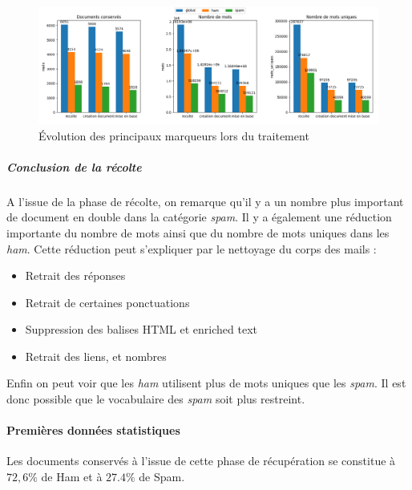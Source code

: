 \documentclass[a4paper,12pt]{article}
\begin{document}
			\begin{figure}[H]
				\includegraphics[width=\linewidth]{img/Statsrecolte.png}
				\caption{Évolution des principaux marqueurs lors du traitement}
			\end{figure}
		
			\subparagraph{Conclusion de la récolte}
				A l'issue de la phase de récolte, on remarque qu'il y a un nombre plus important de document en double dans la catégorie \emph{spam}.				
				Il y a également une réduction importante du nombre de mots ainsi que du nombre de mots uniques dans les \emph{ham}. Cette réduction peut s'expliquer par le nettoyage du corps des mails :
				\begin{itemize}
					\item Retrait des réponses
					\item Retrait de certaines ponctuations
					\item Suppression des balises HTML et enriched text
					\item Retrait des liens, et nombres
				\end{itemize}
				
				Enfin on peut voir que les \emph{ham} utilisent plus de mots uniques que les \emph{spam}. Il est donc possible que le vocabulaire des \emph{spam} soit plus restreint. 
			
				
		\paragraph{Premières données statistiques}
			Les documents conservés à l'issue de cette phase de récupération se constitue à $72,6\%$ de Ham et à $27.4\%$ de Spam.
			
\end{document}
